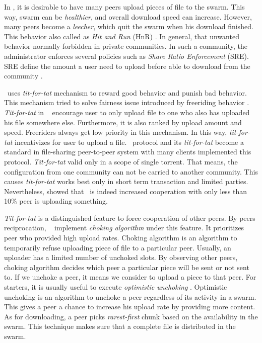 In \bt, it is desirable to have many peers upload pieces of file to the swarm. This way, swarm can be \textit{healthier}, and overall download speed can increase. However, many peers become a \textit{leecher}, which quit the swarm when his download finished. This behavior also called as \textit{Hit and Run} (HnR) \cite{2014:sustainabilitytorrent:chen}. In general, that unwanted behavior normally forbidden in private communities. In such a community, the administrator enforces several policies such as \textit{Share Ratio Enforcement} (SRE). SRE define the amount a user need to upload before able to download from the community \cite{2012:economicbt:kash}. 

\bt~uses \textit{tit-for-tat} mechanism to reward good behavior and punish bad behavior. This mechanism tried to solve fairness issue introduced by freeriding behavior \cite{2003:bittorrent:cohen}. \textit{Tit-for-tat} in \bt~ encourage user to only upload file to one who also has uploaded his file somewhere else. Furthermore, it is also ranked by upload amount and speed. Freeriders always get low priority in this mechanism. In this way, \textit{tit-for-tat} incentivizes for user to upload a file. \bt~protocol and its \textit{tit-for-tat} become a standard in file-sharing peer-to-peer system with many clients implemented this protocol. \textit{Tit-for-tat} valid only in a scope of single torrent. That means, the configuration from one community can not be carried to another community. This causes \textit{tit-for-tat} works best only in short term transaction and limited parties. Nevertheless, \citeauthor{2005:bittorrentcooperation:andrade} showed that \bt~is indeed increased cooperation with only less than 10\% peer is uploading something.

\textit{Tit-for-tat} is a distinguished feature to force cooperation of other peers. By peers reciprocation, \bt~ implement \textit{choking algorithm} under this feature. It prioritizes peer who provided high upload rates. Choking algorithm is an algorithm to temporarily refuse uploading piece of file to a particular peer. Usually, an uploader has a limited number of unchoked slots. By observing other peers, choking algorithm decides which peer a particular piece will be sent or not sent to. If we unchoke a peer, it means we consider to upload a piece to that peer. For starters, it is usually useful to execute \textit{optimistic unchoking} \cite{2003:bittorrent:cohen}. Optimistic unchoking is an algorithm to unchoke a peer regardless of its activity in a swarm. This gives a peer a chance to increase his upload rate by providing more content. As for downloading, a peer picks \textit{rarest-first} chunk based on the availability in the swarm. This technique makes sure that a complete file is distributed in the swarm.

